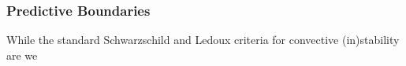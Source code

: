 {\color{brown}
\subsubsection{Predictive Boundaries}

While the standard Schwarzschild and Ledoux criteria for convective (in)stability are we

}